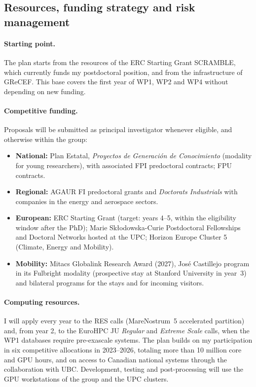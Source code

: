 \documentclass[11pt]{article}
\begin{document}
\subsection{Resources, funding strategy and risk management}\label{sec:resources}
\paragraph{Starting point.} The plan starts from the resources of the ERC Starting Grant
SCRAMBLE, which currently funds my postdoctoral position, and from the infrastructure of
GReCEF. This base covers the first year of WP1, WP2 and WP4 without depending on new
funding.

\paragraph{Competitive funding.} Proposals will be submitted as principal investigator
whenever eligible, and otherwise within the group:
\begin{itemize}
  \item \textbf{National:} Plan Estatal, \emph{Proyectos de Generaci\'on de Conocimiento}
  (modality for young researchers), with associated FPI predoctoral contracts; FPU
  contracts.
  \item \textbf{Regional:} AGAUR FI predoctoral grants and \emph{Doctorats Industrials}
  with companies in the energy and aerospace sectors.
  \item \textbf{European:} ERC Starting Grant (target: years 4--5, within the eligibility
  window after the PhD); Marie Sk\l{}odowska-Curie Postdoctoral Fellowships and Doctoral
  Networks hosted at the UPC; Horizon Europe Cluster 5 (Climate, Energy and Mobility).
  \item \textbf{Mobility:} Mitacs Globalink Research Award (2027), Jos\'e Castillejo
  program in its Fulbright modality (prospective stay at Stanford University in year~3) and bilateral programs for the
  stays and for incoming visitors.
\end{itemize}

\paragraph{Computing resources.} I will apply every year to the RES calls (MareNostrum~5
accelerated partition) and, from year 2, to the EuroHPC JU \emph{Regular} and
\emph{Extreme Scale} calls, when the WP1 databases require pre-exascale systems. The plan
builds on my participation in six competitive allocations in 2023--2026, totaling more
than 10 million core and GPU hours, and on access to Canadian national systems through the
collaboration with UBC. Development, testing and post-processing will use the GPU
workstations of the group and the UPC clusters.
\end{document}
